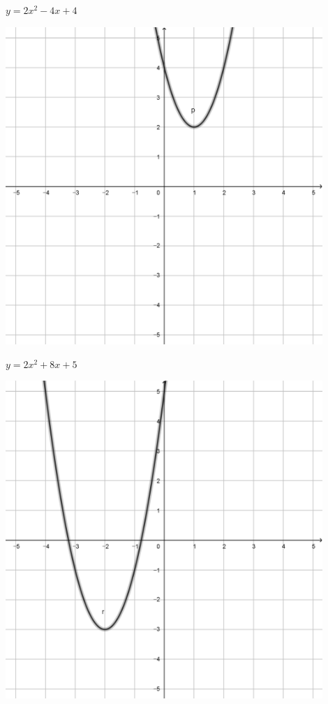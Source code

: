 \documentclass[a4paper]{oblivoir}
\begin{document}
\begin{minipage}{0.45\textwidth}\centering
\(y=2x^2-4x+4\)
\par\bigskip\includegraphics[width=0.9\textwidth]{img/2_quadratic_31}
\end{minipage}
\begin{minipage}{0.45\textwidth}\centering
\(y=2x^2+8x+5\)
\par\bigskip\includegraphics[width=0.9\textwidth]{img/2_quadratic_32}
\end{minipage}\bigskip\bigskip\par
\end{document}
